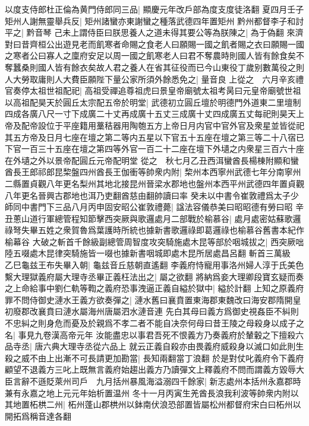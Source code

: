 以度支侍郎杜正倫為黄門侍郎同三品|{
	顯慶元年改戶部為度支度徒洛翻}
夏四月壬子矩州人謝無靈舉兵反|{
	矩州諸蠻亦東謝蠻之種落武德四年置矩州}
黔州都督李子和討平之|{
	黔音琴}
己未上謂侍臣曰朕思養人之道未得其要公等為朕陳之|{
	為于偽翻}
來濟對曰昔齊桓公出遊見老而飢寒者命賜之食老人曰願賜一國之飢者賜之衣曰願賜一國之寒者公曰寡人之廩府安足以周一國之飢寒老人曰君不奪農時則國人皆有餘食矣不奪蠶桑則國人皆有餘衣矣故人君之養人在省其征役而已今山東役丁歲别數萬役之則人大勞取庸則人大費臣願陛下量公家所須外餘悉免之|{
	量音良}
上從之　六月辛亥禮官奏停太祖世祖配祀|{
	高祖受禪追尊祖虎曰景皇帝廟號太祖考昺曰元皇帝廟號世祖}
以高祖配昊天於圓丘太宗配五帝於明堂|{
	武德初立圓丘壇於明德門外道東二里壇制四成各廣八尺一寸下成廣二十丈再成廣十五丈三成廣十丈四成廣五丈每祀則昊天上帝及配帝設位于平座籍用藳秸器用陶匏五方上帝日月内官中官外官及衆星並皆從祀其五方帝及日月七座在壇之第二等内五星以下官五十五座在壇之第三等二十八宿已下官一百三十五座在壇之第四等外官一百二十二座在壇下外壝之内衆星三百六十座在外壝之外以景帝配圓丘元帝配明堂}
從之　秋七月乙丑西洱蠻酋長楊棟附顯和蠻酋長王郎祁郎昆棃盤四州酋長王伽衝等帥衆内附|{
	棃州本西寧州武德七年分南寧州二縣置貞觀八年更名梨州其地北接昆州晉梁水郡地也盤州本西平州武德四年置貞觀八年更名晉興古郡地也洱乃吏翻酋慈由翻帥讀曰率}
癸未以中書令崔敦禮爲太子少師同中書門下三品八月丙申固安昭公崔敦禮薨|{
	諡法容儀恭美曰昭昭德有勞曰昭}
辛丑蔥山道行軍總管程知節擊西突厥與歌邏處月二部戰於榆慕谷|{
	處月處密姑蘇歌邏祿弩失畢五姓之衆賀魯爲葉護時所統也據新書歌邏祿即葛邏祿也榆慕谷舊書本紀作榆幕谷}
大破之斬首千餘級副總管周智度攻突騎施處木昆等部於咽城拔之|{
	西突厥咄陸五啜處木昆律突騎施皆一啜也據新書咽城即處木昆所居處昌呂翻}
斬首三萬級　乙巳龜兹王布失畢入朝|{
	龜兹音丘慈朝直遙翻}
李義府恃寵用事洛州婦人淳于氏美色繫大理獄義府屬大理寺丞畢正義枉法出之|{
	屬之欲翻}
將納爲妾大理卿段寶玄疑而奏之上命給事中劉仁軌等鞫之義府恐事洩逼正義自縊於獄中|{
	縊於計翻}
上知之原義府罪不問侍御史漣水王義方欲奏彈之|{
	漣水舊曰襄賁置東海郡東魏改曰海安郡隋開皇初廢郡改襄賁曰漣水屬海州唐屬泗水漣音連}
先白其母曰義方爲御史視姦臣不糾則不忠糾之則身危而憂及於親爲不孝二者不能自决奈何母曰昔王陵之母殺身以成子之名|{
	事見九卷漢高帝元年}
汝能盡忠以事君吾死不恨義方乃奏義府於輦轂之下擅殺六品寺丞|{
	唐六典大理寺丞從六品上}
就云正義自殺亦由畏義府威殺身以滅口如此則生殺之威不由上出漸不可長請更加勘當|{
	長知兩翻當丁浪翻}
於是對仗叱義府令下義府顧望不退義方三叱上既無言義府始趨出義方乃讀彈文上釋義府不問而謂義方毀辱大臣言辭不遜貶萊州司戶　九月括州暴風海溢溺四千餘家|{
	新志處州本括州永嘉郡時兼有永嘉之地上元元年始析置温州}
冬十一月丙寅生羌酋長浪我利波等帥衆内附以其地置柘栱二州|{
	柘州蓬山郡栱州以鉢南伏浪恐部置皆屬松州都督府宋白曰柘州以開拓爲稱音達各翻}
